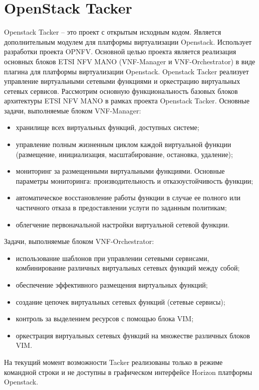\documentclass[oneside,final,14pt,a4paper]{extreport}
\begin{document}
\section{OpenStack Tacker}
Openstack Tacker -- это проект с открытым исходным кодом. Является дополнительным модулем для платформы виртуализации Openstack. Использует разработки проекта OPNFV. Основной целью проекта является реализация основных блоков ETSI NFV MANO (VNF-Manager и VNF-Orchestrator) в виде плагина для платформы виртуализации Openstack. Openstack Tacker реализует управление виртуальными сетевыми функциями и оркестрацию виртуальных сетевых сервисов.
	Рассмотрим основную функциональность базовых блоков архитектуры ETSI NFV MANO в рамках проекта Openstack Tacker. Основные задачи, выполняемые блоком VNF-Manager:
\begin{itemize}
	\item хранилище всех виртуальных функций, доступных системе;
	\item управление полным жизненным циклом каждой виртуальной функции (размещение, инициализация, масштабирование, остановка, удаление);
	\item мониторинг за размещенными виртуальными функциями. Основные параметры мониторинга: производительность и отказоустойчивость функции;
	\item автоматическое восстановление работы функции в случае ее полного или частичного отказа в предоставлении услуги по заданным политикам;
	\item облегчение первоначальной настройки виртуальной сетевой функции.
\end{itemize}

Задачи, выполняемые блоком VNF-Orchestrator:
\begin{itemize}
	\item использование шаблонов при управлении сетевыми сервисами, комбинирование различных виртуальных сетевых функций между собой;
	\item обеспечение эффективного размещения виртуальных функций;
	\item создание цепочек виртуальных сетевых функций (сетевые сервисы);
	\item контроль за выделением ресурсов с помощью блока VIM;
	\item оркестрация виртуальных сетевых функций на множестве различных блоков VIM.
\end{itemize}

На текущий момент возможности Tacker реализованы только в режиме командной строки и не доступны в графическом интерфейсе Horizon платформы Openstack.\cite{tacker-official}
\end{document}
